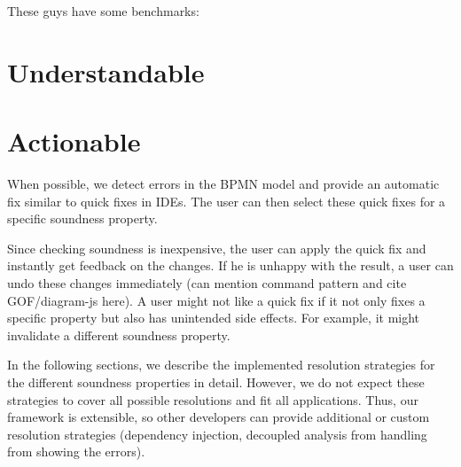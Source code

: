 \documentclass[runningheads]{llncs}
\begin{document}

These guys have some benchmarks:
\cite{corradiniFormalApproachAnalysis2021}

\section{Understandable}

\cite{camundaservicesgmbhBpmnjsTokenSimulation2023}

\section{Actionable}


When possible, we detect errors in the BPMN model and provide an automatic fix similar to quick fixes in IDEs.
The user can then select these quick fixes for a specific soundness property.

Since checking soundness is inexpensive, the user can apply the quick fix and instantly get feedback on the changes.
If he is unhappy with the result, a user can undo these changes immediately (can mention command pattern and cite GOF/diagram-js here).
A user might not like a quick fix if it not only fixes a specific property but also has unintended side effects.
For example, it might invalidate a different soundness property.

In the following sections, we describe the implemented resolution strategies for the different soundness properties in detail.
However, we do not expect these strategies to cover all possible resolutions and fit all applications.
Thus, our framework is extensible, so other developers can provide additional or custom resolution strategies (dependency injection, decoupled analysis from handling from showing the errors).
\end{document}
